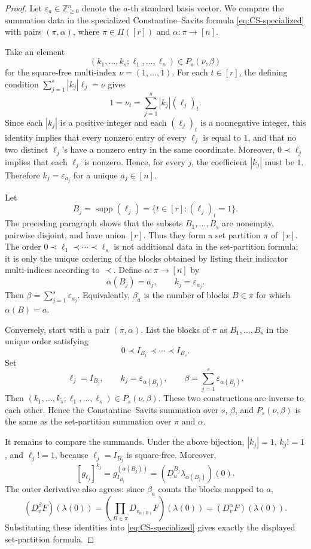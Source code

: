 \documentclass[11pt,reqno]{amsart}
\theoremstyle{definition}
\newcommand{\bbZ}{\mathbb{Z}}
\begin{document}
\begin{proof}
Let \(\varepsilon_a\in\bbZ_{\geq0}^n\) denote the \(a\)-th standard basis vector.  We compare the summation data in the specialized Constantine--Savits formula \eqref{eq:CS-specialized} with pairs \((\pi,\alpha)\), where \(\pi\in\Pi([r])\) and \(\alpha:\pi\to[n]\).

Take an element
\[
	(k_1,\ldots,k_s;\ell_1,\ldots,\ell_s)\in P_s(\nu,\beta)
\]
for the square-free multi-index \(\nu=(1,\ldots,1)\).  For each \(t\in[r]\), the defining condition
\(\sum_{j=1}^s |k_j|\ell_j=\nu\) gives
\[
	1=\nu_t=\sum_{j=1}^s |k_j|(\ell_j)_t.
\]
Since each \(|k_j|\) is a positive integer and each \((\ell_j)_t\) is a nonnegative integer, this identity implies that every nonzero entry of every \(\ell_j\) is equal to \(1\), and that no two distinct \(\ell_j\)'s have a nonzero entry in the same coordinate.  Moreover, \(0\prec\ell_j\) implies that each \(\ell_j\) is nonzero.  Hence, for every \(j\), the coefficient \(|k_j|\) must be \(1\).  Therefore \(k_j=\varepsilon_{a_j}\) for a unique \(a_j\in[n]\).

Let
\[
	B_j=\operatorname{supp}(\ell_j)=\{t\in[r]:(\ell_j)_t=1\}.
\]
The preceding paragraph shows that the subsets \(B_1,\ldots,B_s\) are nonempty, pairwise disjoint, and have union \([r]\).  Thus they form a set partition \(\pi\) of \([r]\).  The order
\(0\prec\ell_1\prec\cdots\prec\ell_s\) is not additional data in the set-partition formula; it is only the unique ordering of the blocks obtained by listing their indicator multi-indices according to \(\prec\).  Define \(\alpha:\pi\to[n]\) by
\[
	\alpha(B_j)=a_j,
	\qquad
	k_j=\varepsilon_{a_j}.
\]
Then \(\beta=\sum_{j=1}^s \varepsilon_{a_j}\).  Equivalently, \(\beta_a\) is the number of blocks \(B\in\pi\) for which \(\alpha(B)=a\).

Conversely, start with a pair \((\pi,\alpha)\).  List the blocks of \(\pi\) as \(B_1,\ldots,B_s\) in the unique order satisfying
\[
	0\prec I_{B_1}\prec\cdots\prec I_{B_s}.
\]
Set
\[
	\ell_j=I_{B_j},
	\qquad
	k_j=\varepsilon_{\alpha(B_j)},
	\qquad
	\beta=\sum_{j=1}^s \varepsilon_{\alpha(B_j)}.
\]
Then \((k_1,\ldots,k_s;\ell_1,\ldots,\ell_s)\in P_s(\nu,\beta)\).  These two constructions are inverse to each other.  Hence the Constantine--Savits summation over \(s\), \(\beta\), and \(P_s(\nu,\beta)\) is the same as the set-partition summation over \(\pi\) and \(\alpha\).

It remains to compare the summands.  Under the above bijection, \(|k_j|=1\), \(k_j!=1\), and \(\ell_j!=1\), because \(\ell_j=I_{B_j}\) is square-free.  Moreover,
\[
	[g_{\ell_j}]^{k_j}
	=
	g_{I_{B_j}}^{(\alpha(B_j))}
	=
	\left(D_u^{B_j}\lambda_{\alpha(B_j)}\right)(0).
\]
The outer derivative also agrees: since \(\beta_a\) counts the blocks mapped to \(a\),
\[
	(D_v^\beta F)(\lambda(0))
	=
	\left(
	\prod_{B\in\pi}D_{v_{\alpha(B)}}F
	\right)(\lambda(0))
	=
	(D_v^\alpha F)(\lambda(0)).
\]
Substituting these identities into \eqref{eq:CS-specialized} gives exactly the displayed set-partition formula.
\end{proof}
\end{document}
